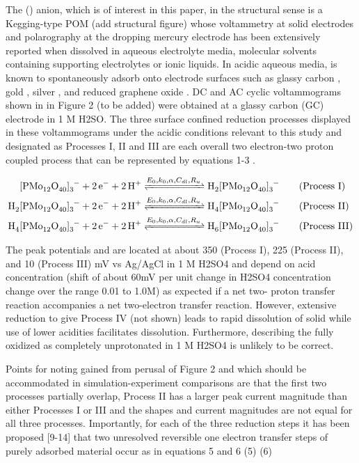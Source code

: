 \documentclass[a4paper, 12pt]{article}
\begin{document}
The () anion, which is of interest in this paper, in the structural sense is a 
Kegging-type POM (add structural figure) whose voltammetry at solid electrodes 
and polarography at the dropping mercury electrode has been extensively reported 
when dissolved in aqueous electrolyte media, molecular solvents containing 
supporting electrolytes or ionic liquids. In acidic aqueous media,   is known to 
spontaneously adsorb onto electrode surfaces such as glassy carbon 
\cite{choi2009adsorption}, gold \cite{choi2009adsorption}, silver 
\cite{choi2009adsorption}, and reduced graphene oxide 
\cite{ding2014phosphomolybdate}.  DC and AC cyclic voltammograms shown in in 
Figure 2 (to be added) were obtained at a glassy carbon (GC) electrode in 1 M 
H2SO. The three  surface confined reduction processes displayed in these 
voltammograms under  the acidic conditions relevant to this study  and 
designated as Processes I, II and III are each overall  two electron-two proton 
coupled process   that can be represented by  equations 1-3 
\cite{chen2013fabrication}.  

\begin{align}
    \cee{[PMo12O40]3- + 2e- + 2H+ &<=>[E_0,k_0,\alpha, C_{dl}, R_u] 
    H2[PMo12O40]3-} \qquad \text{(Process I)} \\
    \cee{H2[PMo12O40]3- + 2e- + 2H+ &<=>[E_0,k_0,\alpha, C_{dl}, R_u] 
    H4[PMo12O40]3-} \qquad \text{(Process II)} \\
    \cee{H4[PMo12O40]3- + 2e- + 2H+ &<=>[E_0,k_0,\alpha, C_{dl}, R_u] 
    H6[PMo12O40]3-} \qquad \text{(Process III)}
\end{align}


The peak potentials and are located   at about 350 (Process I), 225 (Process 
II), and 10 (Process III) mV vs Ag/AgCl in 1 M H2SO4 and depend on acid 
concentration (shift of about 60mV per unit change in H2SO4 concentration change 
over the range 0.01 to 1.0M) as expected if   a net two- proton transfer 
reaction accompanies a net two-electron transfer reaction. However, extensive 
reduction to give Process IV (not shown) leads to rapid dissolution of solid 
while use of lower acidities facilitates dissolution. Furthermore, describing 
the fully oxidized as completely unprotonated in 1 M H2SO4 is unlikely to be 
correct.  


Points for noting gained from perusal of Figure 2 and which should be 
accommodated in simulation-experiment comparisons are that the first two 
processes partially overlap, Process II has a larger peak current magnitude than 
either Processes I or III and the shapes and current magnitudes are not equal 
for all three processes. Importantly, for each of the three reduction steps it 
has been proposed [9-14] that two unresolved reversible one electron transfer 
steps of purely adsorbed material occur as in equations 5 and 6 (5)
 									 (6)		
\end{document}

